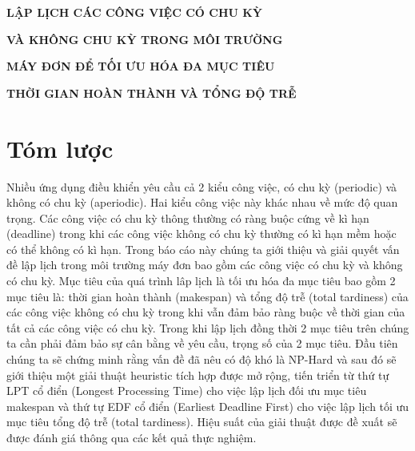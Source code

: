 \documentclass[a4paper,12pt]{article}
\begin{document}
\centerline{\textbf{\large{LẬP LỊCH CÁC CÔNG VIỆC CÓ CHU KỲ}}}
\centerline{\textbf{\large{VÀ KHÔNG CHU KỲ TRONG MÔI TRƯỜNG}}}
\centerline{\textbf{\large{MÁY ĐƠN ĐỂ TỐI ƯU HÓA ĐA MỤC TIÊU}}}
\centerline{\textbf{\large{THỜI GIAN HOÀN THÀNH VÀ TỔNG ĐỘ TRỄ}}}
\tableofcontents
\newpage
\section{Tóm lược}
Nhiều ứng dụng điều khiển yêu cầu cả 2 kiểu công việc, có chu kỳ (periodic) và không có chu kỳ (aperiodic). Hai kiểu công việc này khác nhau về mức độ quan trọng. Các công việc có chu kỳ thông thường có ràng buộc cứng về kì hạn (deadline) trong khi các công việc không có chu kỳ thường có kì hạn mềm hoặc có thể không có kì hạn. Trong báo cáo này chúng ta giới thiệu và giải quyết vấn đề lập lịch trong môi trường máy đơn bao gồm các công việc có chu kỳ và không có chu kỳ. Mục tiêu của quá trình lâp lịch là tối ưu hóa đa mục tiêu bao gồm 2 mục tiêu là: thời gian hoàn thành (makespan) và tổng độ trễ (total tardiness) của các công việc không có chu kỳ trong khi vẫn đảm bảo ràng buộc về thời gian của tất cả các công việc có chu kỳ. Trong khi lập lịch đồng thời 2 mục tiêu trên chúng ta cần phải đảm bảo sự cân bằng về yêu cầu, trọng số của 2 mục tiêu. Đầu tiên chúng ta sẽ chứng minh rằng vấn đề đã nêu có độ khó là NP-Hard và sau đó sẽ giới thiệu một giải thuật heuristic tích hợp được mở rộng, tiến triển từ thứ tự LPT cổ điển (Longest Processing Time) cho việc lập lịch đối ưu mục tiêu makespan và thứ tự EDF cổ điển (Earliest Deadline First) cho việc lập lịch tối ưu mục tiêu tổng độ trễ (total tardiness). Hiệu suất của giải thuật được đề xuất sẽ được đánh giá thông qua các kết quả thực nghiệm.
\end{document}
